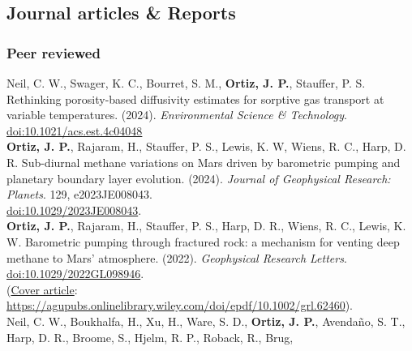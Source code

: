 \documentclass[11pt, letterpaper]{article}
\newcommand{\amper}{{\fontspec[Scale=.95]{Adobe Caslon Pro}\selectfont\itshape\&}}
\newcommand{\years}[1]{\marginnote{\scriptsize #1}}
\begin{document}
\subsection*{Journal articles \& Reports}

\subsubsection*{Peer reviewed}

\noindent
\hypersetup{linkcolor=black,citecolor=blue,filecolor=black,urlcolor=black} 
%
\years{2024}Neil, C. W., Swager, K. C., Bourret, S. M., \textbf{Ortiz, J.  P.},
Stauffer, P. S.  Rethinking porosity-based diffusivity estimates for sorptive
gas transport at variable temperatures.  (2024).  \emph{Environmental Science
\& Technology}.
\href{https://doi.org/10.1021/acs.est.4c04048}{doi:10.1021/acs.est.4c04048}\\
%
\years{2024}\textbf{Ortiz, J. P.}, Rajaram, H., Stauffer, P. S., Lewis, K. W,
Wiens, R. C., Harp, D. R.  Sub-diurnal methane variations on Mars driven by
barometric pumping and planetary boundary layer evolution. (2024). \emph{Journal of
Geophysical Research: Planets}. 129, e2023JE008043. \\
\href{https://agupubs.onlinelibrary.wiley.com/doi/epdf/10.1029/2023JE008043}{doi:10.1029/2023JE008043}.
\JournalofGeophysicalOOOOSubDiurnalMethaneVar \\ 
%
\years{2022}\textbf{Ortiz, J. P.}, Rajaram, H., Stauffer, P. S., Harp, D. R.,
Wiens, R. C., Lewis, K. W.  Barometric pumping through fractured rock: a
mechanism for venting deep methane to Mars' atmosphere. (2022). \emph{Geophysical
Research Letters}. 
\href{https://agupubs.onlinelibrary.wiley.com/doi/epdf/10.1029/2022GL098946}{doi:10.1029/2022GL098946}.
\GeophysicalResearchLOOOOBarometricpumpingthr\\
\hypersetup{linkcolor=black,citecolor=blue,filecolor=black,urlcolor=blue} 
(\underline{Cover article}:
\href{https://agupubs.onlinelibrary.wiley.com/doi/epdf/10.1002/grl.62460}{https://agupubs.onlinelibrary.wiley.com/doi/epdf/10.1002/grl.62460}).\\ 
%
\hypersetup{linkcolor=black,citecolor=blue,filecolor=black,urlcolor=black} 
\years{2022}Neil, C. W., Boukhalfa, H., Xu, H., Ware, S. D., \textbf{Ortiz, J.
P.}, Avendaño, S. T., Harp, D. R., Broome, S., Hjelm, R. P., Roback, R., Brug,
\end{document}
